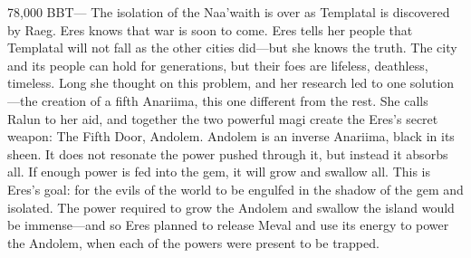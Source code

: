 \documentclass[smalldemyvopaper,11pt,twoside,onecolumn,openright,extrafontsizes]{memoir}
\begin{document}
78,000 BBT— The isolation of the Naa’waith is over as Templatal is discovered by Raeg. Eres knows that war is soon to come. Eres tells her people that Templatal will not fall as the other cities did—but she knows the truth. The city and its people can hold for generations, but their foes are lifeless, deathless, timeless.  Long she thought on this problem, and her research led to one solution—the creation of a fifth Anariima, this one different from the rest. She calls Ralun to her aid, and together the two powerful magi create the Eres’s secret weapon: The Fifth Door, Andolem. Andolem is an inverse Anariima, black in its sheen. It does not resonate the power pushed through it, but instead it absorbs all. If enough power is fed into the gem, it will grow and swallow all. This is Eres’s goal: for the evils of the world to be engulfed in the shadow of the gem and isolated. The power required to grow the Andolem and swallow the island would be immense—and so Eres planned to release Meval and use its energy to power the Andolem, when each of the powers were present to be trapped. 
\end{document}
